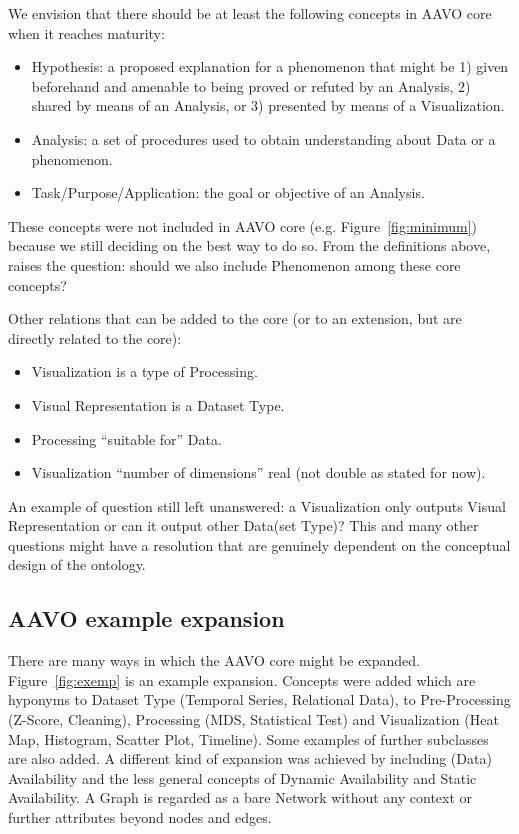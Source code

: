 \documentclass[12pt,fleqn]{article}
\begin{document}
We envision that there should be at least the following concepts in
AAVO core when it reaches maturity:
\begin{itemize}
	\item Hypothesis: a proposed explanation for a phenomenon that might be
		1) given beforehand and amenable to being proved or refuted by an Analysis,
		2) shared by means of an Analysis,
		or 3) presented by means of a Visualization.
	\item Analysis: a set of procedures used to obtain understanding about
		Data or a phenomenon.
	\item Task/Purpose/Application: the goal or objective of an Analysis.
\end{itemize}
\noindent These concepts were not included in AAVO core (e.g. Figure~\ref{fig:minimum})
because we still deciding on the best way to do so.
From the definitions above, raises the question:
should we also include Phenomenon among these core concepts?

Other relations that can be added to the core (or to an extension, but
are directly related to the core):
\begin{itemize}
	\item Visualization is a type of Processing.
	\item Visual Representation is a Dataset Type.
	\item Processing ``suitable for'' Data.
	\item Visualization ``number of dimensions'' real (not double as stated for now).
\end{itemize}

An example of question still left unanswered:
a Visualization only outputs Visual Representation
or can it output other Data(set Type)?
This and many other questions might have a resolution
that are genuinely dependent on the conceptual design of the ontology.


\subsection{AAVO example expansion}\label{sec:ext}
There are many ways in which the AAVO core might be expanded.
Figure~\ref{fig:exemp} is an example expansion.
Concepts were added which are hyponyms to Dataset Type (Temporal Series, Relational Data),
to Pre-Processing (Z-Score, Cleaning), Processing (MDS, Statistical Test)
and Visualization (Heat Map, Histogram, Scatter Plot, Timeline).
Some examples of further subclasses are also added.
A different kind of expansion was achieved by including (Data) Availability
and the less general concepts of Dynamic Availability and Static Availability.
A Graph is regarded as a bare Network without any context or further attributes beyond
nodes and edges.
\end{document}
